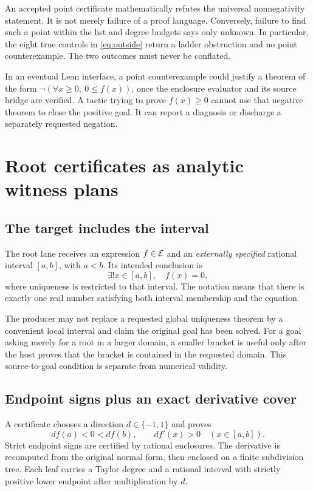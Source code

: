 An accepted point certificate mathematically refutes the universal nonnegativity statement. It is not merely failure of a proof language. Conversely, failure to find such a point within the list and degree budgets says only unknown. In particular, the eight true controls in \eqref{eq:outside} return a ladder obstruction and no point counterexample. The two outcomes must never be conflated.

In an eventual Lean interface, a point counterexample could justify a theorem of the form $\neg(\forall x\ge0,\ 0\le f(x))$, once the enclosure evaluator and its source bridge are verified. A tactic trying to prove $f(x)\ge0$ cannot use that negative theorem to close the positive goal. It can report a diagnosis or discharge a separately requested negation.

\section{Root certificates as analytic witness plans}
\label{sec:roots}

\subsection{The target includes the interval}

The root lane receives an expression $f\in\mathcal E$ and an \emph{externally specified} rational interval $[a,b]$, with $a<b$. Its intended conclusion is
\begin{equation}
 \exists! x\in[a,b],\quad f(x)=0,
 \label{eq:unique-root}
\end{equation}
where uniqueness is restricted to that interval. The notation means that there is exactly one real number satisfying both interval membership and the equation.

The producer may not replace a requested global uniqueness theorem by a convenient local interval and claim the original goal has been solved. For a goal asking merely for a root in a larger domain, a smaller bracket is useful only after the host proves that the bracket is contained in the requested domain. This source-to-goal condition is separate from numerical validity.

\subsection{Endpoint signs plus an exact derivative cover}

A certificate chooses a direction $d\in\{-1,1\}$ and proves
\begin{equation}
 df(a)<0<df(b),\qquad df'(x)>0\quad(x\in[a,b]).
 \label{eq:root-signs}
\end{equation}
Strict endpoint signs are certified by rational enclosures. The derivative is recomputed from the original normal form, then enclosed on a finite subdivision tree. Each leaf carries a Taylor degree and a rational interval with strictly positive lower endpoint after multiplication by $d$.

